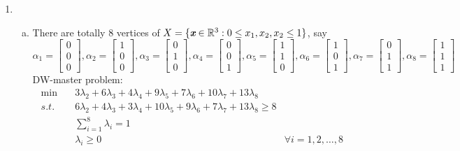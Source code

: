 \begin{enumerate}
	\newpage
	\item \begin{enumerate}[(a)]
		\item There are totally $8$ vertices of $X = \{\textit{\textbf{x}}\in \mathbb{R}^3: 0\le x_1,x_2,x_2\le 1 \}$, say $$\alpha_1 = \begin{bmatrix}
		0\\0\\0
		\end{bmatrix}, \alpha_2 = \begin{bmatrix}
		1\\0\\0
		\end{bmatrix},\alpha_3 = \begin{bmatrix}
		0\\1\\0
		\end{bmatrix},\alpha_4 = \begin{bmatrix}
		0\\0\\1
		\end{bmatrix},\alpha_5 = \begin{bmatrix}
		1\\1\\0
		\end{bmatrix},\alpha_6 = \begin{bmatrix}
		1\\0\\1
		\end{bmatrix},\alpha_7 = \begin{bmatrix}
		0\\1\\1
		\end{bmatrix},\alpha_8 = \begin{bmatrix}
		1\\1\\1
		\end{bmatrix}$$
		DW-master problem:
		\begin{align*}
		\min \quad &3\lambda_2+6\lambda_3+4\lambda_4+9\lambda_5+7\lambda_6+10\lambda_7+13\lambda_8\\
		s.t. \quad &6\lambda_2+4\lambda_3+3\lambda_4+10\lambda_5+9\lambda_6+7\lambda_7+13\lambda_8\ge 8\\
		&\sum_{i=1}^8\lambda_i=1\\
		&\lambda_i \ge 0&\forall i=1,2,\ldots,8
		\end{align*}
		

\end{enumerate}
\end{enumerate}
